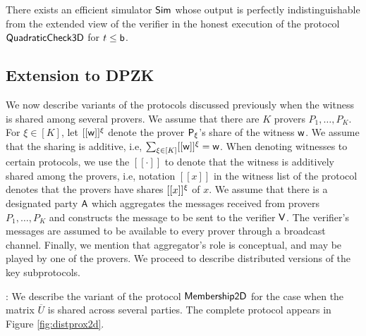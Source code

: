 \begin{lemma}\label{lem:simquadcheck}
There exists an efficient simulator $\mathsf{Sim}$ whose output is perfectly
indistinguishable from the extended view of the verifier in the honest execution
of the protocol $\mathsf{QuadraticCheck3D}$ for $t\leq \mathsf{b}$.
\end{lemma}


\subsection{Extension to DPZK}
We now describe variants of the protocols discussed previously when the witness
is shared among several provers. We assume that there are $K$ provers
$P_1,\ldots,P_K$. For $\xi\in [K]$, let $[[{\mathsf{w}}]]^\xi$ denote the prover
$\mathsf{P}_\xi$'s share of the witness $\mathsf{w}$. We assume that the sharing is additive,
i.e, $\sum_{\xi\in [K]}[[{\mathsf{w}}]]^\xi=\mathsf{w}$. When denoting witnesses to certain
protocols, we use the $[[\cdot]]$ to denote that the witness is additively
shared among the provers, i.e, notation $[[x]]$ in the witness list of the
protocol denotes that the provers have shares $[[{x}]]^\xi$ of $x$. We assume that
there is a designated party $\mathsf{A}$ which aggregates the messages received from
provers $P_1,\ldots,P_K$ and constructs the message to be sent to the verifier
$\mathsf{V}$. The verifier's  messages are assumed to be available to every
prover through a broadcast channel. Finally, we mention that aggregator's role
is conceptual, and may be played by one of the provers. We proceed to describe
distributed versions of the key subprotocols.

: We describe the variant of the
protocol $\mathsf{Membership2D}$ for the case when the matrix $\overline{U}$ is shared
across several parties. The complete protocol appears in Figure
\ref{fig:distprox2d}. \smallskip

